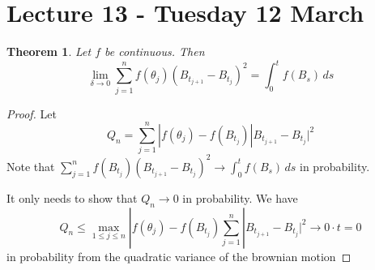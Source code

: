 \documentclass[10pt, oneside, reqno]{amsart}
\theoremstyle{plain}%
\newtheorem{thm}{Theorem}[section]
\theoremstyle{definition}
\theoremstyle{remark}
\begin{document}

\section{Lecture 13 - Tuesday 12 March} %
\label{sec:lecture_13_tuesday_12_march}



\begin{thm}
	Let $f$ be continuous.  Then \[
		\lim_{\delta \rightarrow 0 } \sum_{j=1}^n f(\theta_j) (B_{t_{j+1}} - B_{t_j})^2 = \int_0^t f(B_s) \, ds
	\]
\end{thm}
\begin{proof}
	Let \[
		Q_n = \sum_{j=1}^n |f(\theta_j)  - f(B_{t_j}) |B_{t_{j+1}} - B_{t_j}|^2  
	\]
	Note that $\sum_{j=1}^n f(B_{t_j}) (B_{t_{j+1}} - B_{t_j})^2 \rightarrow \int_0^t f(B_s) \, ds$ in probability.  
	
	It only needs to show that $Q_n \rightarrow 0$ in probability.   We have \[
		Q_n \leq \max_{1 \leq j \leq n} | f(\theta_j) - f(B_{t_j})\sum_{j=1}^n |B_{t_{j+1}} - B_{t_j}|^2 \rightarrow 0 \cdot t = 0
	\] in probability from the quadratic variance of the brownian motion 
\end{proof}
\end{document}
